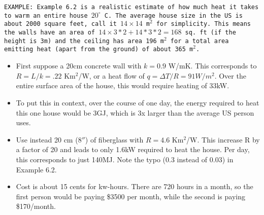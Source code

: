 \documentclass[11pt]{book}
\def\be{\begin{equation}}
\def\ee{\end{equation}}
\newcommand\example[1]{{\tt EXAMPLE: #1}}
\newcommand\bei{\begin{itemize}}
\newcommand\eei{\end{itemize}}
\newcommand\lecture[1]{\newpage
\addtocounter{lectureno}{1}
\setcounter{secno}{0}
\begin{center}
 {\bf Lecture \arabic{lectureno}: #1}
\end{center}
}
\newcounter{lectureno}
\newcounter{secno}
\begin{document}
\example{Example 6.2 is a realistic estimate of how much heat it takes to warm an entire house $20^\circ$ C. 
The average house size in the US is about 2000 square feet, call it $14\times 14$ m$^2$ for simplicity. This means the walls have an area of $14\times 3*2 + 14*3*2=168$ sq. ft (if the height is 3m) and the ceiling has area 196 m$^2$ for a total area emitting heat (apart from the ground) of about 365 m$^2$. 
\bei
\item First suppose a 20cm concrete wall with $k=0.9$ W/mK. This corresponds to $R=L/k=.22$ Km$^2$/W, or a heat flow of $q=\Delta T/R = 91 W/m^2$. Over the entire surface area of the house, this would require heating of 33kW.
\item
To put this in context, over the course of one day, the energy required to heat this one house would be 3GJ, which is 3x larger than the average US person uses.

\item Use instead 20 cm ($8''$) of fiberglass with $R=4.6$ Km$^2$/W. This increase R by a factor of 20 and leads to only 1.6kW required to heat the house. Per day, this corresponds to just 140MJ. 
Note the typo (0.3 instead of 0.03) in Example 6.2.

\item Cost is about 15 cents for kw-hours. There are 720 hours in a month, so the first person would be paying \$3500 per month, while the second is paying \$170/month.
\eei}


%

\end{document}
